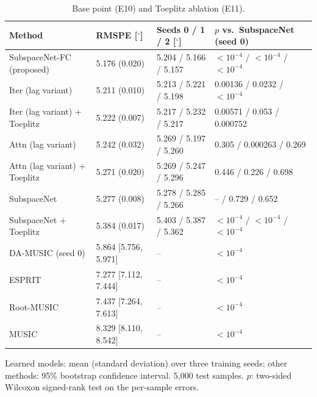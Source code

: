 \begin{table}[h!]
\centering
\small
\caption{Base point (E10) and Toeplitz ablation (E11).}
\label{tab:e10}
\begin{tabular}{llll}
\toprule
Method & RMSPE [$^\circ$] & Seeds 0 / 1 / 2 [$^\circ$] & $p$ vs.\ SubspaceNet (seed 0) \\
\midrule
SubspaceNet-FC (proposed) & 5.176 (0.020) & 5.204 / 5.166 / 5.157 & $<10^{-4}$ / $<10^{-4}$ / $<10^{-4}$ \\
Iter (lag variant) & 5.211 (0.010) & 5.213 / 5.221 / 5.198 & 0.00136 / 0.0232 / $<10^{-4}$ \\
Iter (lag variant) + Toeplitz & 5.222 (0.007) & 5.217 / 5.232 / 5.217 & 0.00571 / 0.053 / 0.000752 \\
Attn (lag variant) & 5.242 (0.032) & 5.269 / 5.197 / 5.260 & 0.305 / 0.000263 / 0.269 \\
Attn (lag variant) + Toeplitz & 5.271 (0.020) & 5.269 / 5.247 / 5.296 & 0.446 / 0.226 / 0.698 \\
SubspaceNet & 5.277 (0.008) & 5.278 / 5.285 / 5.266 & -- / 0.729 / 0.652 \\
SubspaceNet + Toeplitz & 5.384 (0.017) & 5.403 / 5.387 / 5.362 & $<10^{-4}$ / $<10^{-4}$ / $<10^{-4}$ \\
\midrule
DA-MUSIC (seed 0) & 5.864 [5.756, 5.971] & -- & $<10^{-4}$ \\
ESPRIT & 7.277 [7.112, 7.444] & -- & $<10^{-4}$ \\
Root-MUSIC & 7.437 [7.264, 7.613] & -- & $<10^{-4}$ \\
MUSIC & 8.329 [8.110, 8.542] & -- & $<10^{-4}$ \\
\hline
\end{tabular}
\par\smallskip\parbox{0.95\textwidth}{\footnotesize Learned models: mean (standard deviation) over three training seeds; other methods: 95\% bootstrap confidence interval. 5,000 test samples. $p$: two-sided Wilcoxon signed-rank test on the per-sample errors.}
\end{table}
